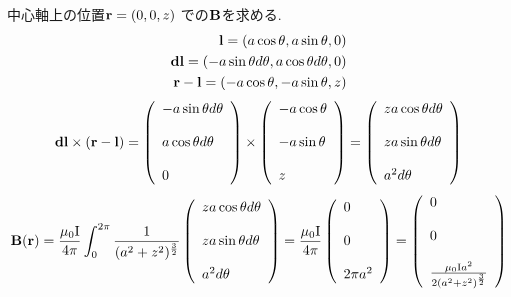 \documentclass{jsarticle}
\begin{document}
中心軸上の位置${\bf r} = (0,0,z)$ での${\bf B}$を求める.
\begin{eqnarray*}
{\bf l} = (a \cos\theta,a\sin\theta,0) \\
{\bf dl} = (-a \sin \theta d\theta,a \cos \theta d\theta,0) \\
{\bf r}-{\bf l}=(-a \cos\theta,-a\sin\theta,z) \\
\end{eqnarray*}
\begin{eqnarray*}
{\bf dl} \times ({\bf r}-{\bf l}) = \left(
\begin{array}{l}
-a \sin \theta d\theta \\
\\
a \cos \theta d\theta \\
\\
0
\end{array}
\right)
\times
\left(
\begin{array}{l}
-a \cos\theta \\
\\
-a\sin\theta \\
\\
z
\end{array}
\right)
=
\left(
\begin{array}{l}
za \cos\theta d\theta \\
\\
za \sin\theta d\theta \\
\\
a^2 d\theta
\end{array}
\right)
\end{eqnarray*}
\begin{eqnarray*}
{\bf B}({\bf r})=\frac{\mu_0 {\rm I}}{4 \pi} \int_{0}^{2 \pi} \frac{1}{(a^2+z^2)^{\frac{3}{2}}}
\left(
\begin{array}{l}
za \cos\theta d\theta \\
\\
za \sin\theta d\theta \\
\\
a^2 d\theta
\end{array}
\right)
=
\frac{\mu_0 {\rm I}}{4 \pi}
\left(
\begin{array}{l}
0 \\
\\
0 \\
\\
2 \pi a^2
\end{array}
\right)
=
\left(
\begin{array}{l}
0 \\
\\
0 \\
\\
\frac{\mu_0 {\rm I}a^2}{2 (a^2+z^2)^{\frac{3}{2}} }
\end{array}
\right)
\end{eqnarray*}
\end{document}

